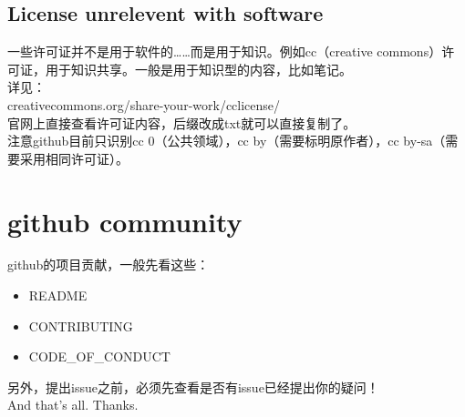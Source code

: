 \documentclass{article}
\begin{document}
\subsection{License unrelevent with software}
\noindent
一些许可证并不是用于软件的……而是用于知识。例如cc（creative commons）许可证，用于知识共享。一般是用于知识型的内容，比如笔记。\\
详见：\\
creativecommons.org/share-your-work/cclicense/\\
官网上直接查看许可证内容，后缀改成txt就可以直接复制了。\\
注意github目前只识别cc 0（公共领域），cc by（需要标明原作者），cc by-sa（需要采用相同许可证）。
\section{github community}
\noindent
github的项目贡献，一般先看这些：
\begin{itemize}
    \item README
    \item CONTRIBUTING
    \item CODE\_OF\_CONDUCT
\end{itemize}
另外，提出issue之前，必须先查看是否有issue已经提出你的疑问！\\
And that's all. Thanks.
\end{document}
